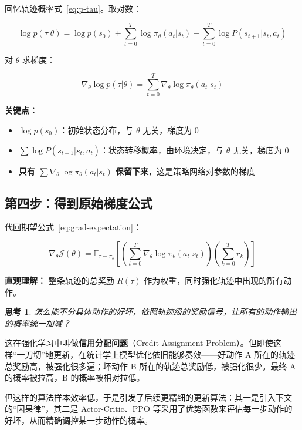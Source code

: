 \documentclass[12pt,a4paper]{article}
\newcommand{\E}{\mathbb{E}}
\newcommand{\grad}{\nabla}
\theoremstyle{noteplain}
\theoremstyle{noteexercise}
\newtheorem{exercise}{思考}[section]
\begin{document}
回忆轨迹概率式~\eqref{eq:p-tau}。取对数：

\begin{equation}\label{eq:log-p-tau}
  \log p(\tau|\theta)
  = \log p(s_0)
  + \sum_{t=0}^{T} \log \pi_\theta(a_t|s_t)
  + \sum_{t=0}^{T} \log P(s_{t+1}|s_t,a_t)
\end{equation}

对 $\theta$ 求梯度：

\begin{equation}\label{eq:grad-log-p-tau}
  \grad_\theta \log p(\tau|\theta) = \sum_{t=0}^{T} \grad_\theta \log \pi_\theta(a_t|s_t)
\end{equation}

\textbf{关键点：}
\begin{itemize}
  \setlength{\itemsep}{0.2em}
  \item $\log p(s_0)$：初始状态分布，与 $\theta$ 无关，梯度为 $0$
  \item $\sum \log P(s_{t+1}|s_t,a_t)$：状态转移概率，由环境决定，与 $\theta$ 无关，梯度为 $0$
  \item \textbf{只有 $\sum \grad_\theta \log \pi_\theta(a_t|s_t)$ 保留下来}，这是策略网络对参数的梯度
\end{itemize}

\subsection{第四步：得到原始梯度公式}\label{ssec:step4}

代回期望公式~\eqref{eq:grad-expectation}：

\begin{equation}\label{eq:grad-raw}
  \grad_\theta \mathcal{J}(\theta)
  = \E_{\tau\sim\pi_\theta}\left[
    \left( \sum_{t=0}^{T} \grad_\theta \log \pi_\theta(a_t|s_t) \right)
    \left( \sum_{k=0}^{T} r_k \right)
  \right]
\end{equation}

\textbf{直观理解：} 整条轨迹的总奖励 $R(\tau)$ 作为权重，同时强化轨迹中出现的所有动作。

\begin{exercise}
  怎么能不分具体动作的好坏，依照轨迹级的奖励信号，让所有的动作输出的概率统一加减？
\end{exercise}

\begin{keypoint}[答：信用分配问题]
  这在强化学习中叫做\textbf{信用分配问题}（Credit Assignment Problem）。但即使这样``一刀切''地更新，在统计学上模型优化依旧能够奏效——好动作 A 所在的轨迹总奖励高，被强化很多遍；坏动作 B 所在的轨迹总奖励低，被强化很少。最终 A 的概率被拉高，B 的概率被相对拉低。

  但这样的算法样本效率低，于是引发了后续更精细的更新算法：其一是引入下文的``因果律''，其二是 Actor-Critic、PPO 等采用了优势函数来评估每一步动作的好坏，从而精确调控某一步动作的概率。
\end{keypoint}
\end{document}
